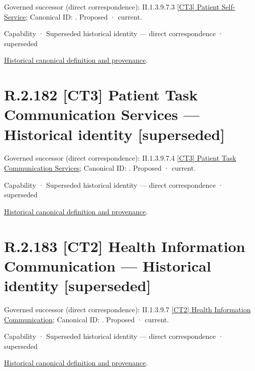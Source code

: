 {\small Governed successor (direct correspondence): II.1.3.9.7.3 \hyperref[element:d4956cab8b2b46c396899949c9486a1c]{[CT3] Patient Self-Service}; Canonical ID: \texttt{}. Proposed · current.}\par
\label{element:60f427e6b5764757b909624085a2af89}
{\small Capability · Superseded historical identity — direct correspondence · superseded}\par
\href{../../../../../../../continuum/strategy/capability/60f427e6b5764757b909624085a2af89.md}{Historical canonical definition and provenance}.\par
\section*{R.2.182 [CT3] Patient Task Communication Services — Historical identity [superseded]}
\label{navigation:R.2.182}

{\small Governed successor (direct correspondence): II.1.3.9.7.4 \hyperref[element:ba8ce1d54ace4bc9aa3521dd954f36cb]{[CT3] Patient Task Communication Services}; Canonical ID: \texttt{}. Proposed · current.}\par
\label{element:0914f2bb267449e282e9ae0f7407d9fe}
{\small Capability · Superseded historical identity — direct correspondence · superseded}\par
\href{../../../../../../../continuum/strategy/capability/0914f2bb267449e282e9ae0f7407d9fe.md}{Historical canonical definition and provenance}.\par
\section*{R.2.183 [CT2] Health Information Communication — Historical identity [superseded]}
\label{navigation:R.2.183}

{\small Governed successor (direct correspondence): II.1.3.9.7 \hyperref[element:7925605bf60f4b288e826020409a09d9]{[CT2] Health Information Communication}; Canonical ID: \texttt{}. Proposed · current.}\par
\label{element:bcefb378424842fcb6d703208c3f8773}
{\small Capability · Superseded historical identity — direct correspondence · superseded}\par
\href{../../../../../../../continuum/strategy/capability/bcefb378424842fcb6d703208c3f8773.md}{Historical canonical definition and provenance}.\par
